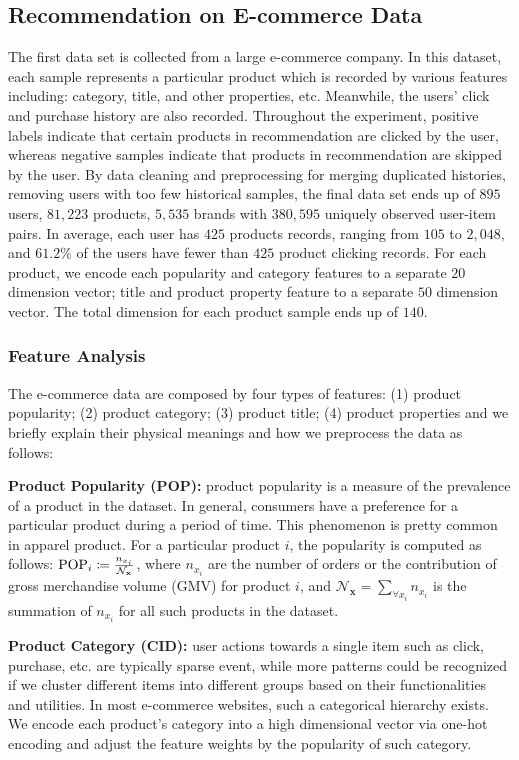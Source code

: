 \subsection{Recommendation on E-commerce Data}
The first data set is collected from a large e-commerce company.  In this dataset, each sample represents a particular product which is recorded by various features including: category, title, and other properties, etc.  Meanwhile, the users' click and purchase history are also recorded. Throughout the experiment, positive labels indicate that certain products in recommendation are clicked by the user, whereas negative samples indicate that products in recommendation are skipped by the user.  By data cleaning and preprocessing for merging duplicated histories, removing users with too few historical samples, the final data set ends up of $895$ users, $81,223$ products, $5,535$ brands with $380,595$ uniquely observed user-item pairs.  In average, each user has $425$ products records, ranging from $105$ to $2,048$, and $61.2\%$ of the users have fewer than $425$ product clicking records.  For each product, we encode each popularity and category features to a separate $20$ dimension vector; title and product property feature to a separate $50$ dimension vector.   The total dimension for each product sample ends up of $140$.

\subsubsection{Feature Analysis}
The e-commerce data are composed by four types of features: (1) product popularity; (2) product category; (3) product title; (4) product properties and we briefly explain their physical meanings and how we preprocess the data as follows:

\textbf{Product Popularity (POP):} product popularity is a measure of the prevalence of a product in the dataset. In general, consumers have a preference for a particular product during a period of time. This phenomenon is pretty common in apparel product. For a particular product $i$, the popularity is computed as follows: $\mathrm{\scriptsize POP}_{i} \coloneqq \frac{n_{x_i}}{\mathcal{N}_\mathbf{x}}$, where $n_{x_i}$ are the number of orders or the contribution of gross merchandise volume (GMV) for product $i$,  and $\mathcal{N}_\mathbf{x} = \sum_{\forall x_i}n_{x_i}$ is the summation of $n_{x_i}$ for all such products in the dataset.

\textbf{Product Category (CID):}  user actions towards a single item such as click, purchase, etc. are typically sparse event, while more patterns could be recognized if we cluster different items into different groups based on their functionalities and utilities.  In most e-commerce websites, such a categorical hierarchy exists.    We encode each product's category into a high dimensional vector via one-hot encoding and adjust the feature weights by the popularity of such category.

